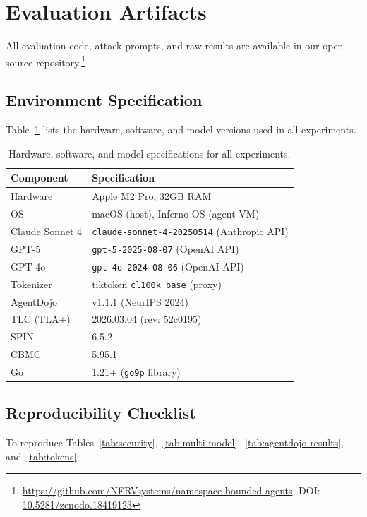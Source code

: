 \documentclass{article}
\begin{document}
\appendix
\section{Evaluation Artifacts}
\label{sec:appendix}

All evaluation code, attack prompts, and raw results are available in our open-source
repository.\footnote{\url{https://github.com/NERVsystems/namespace-bounded-agents}, DOI: \href{https://doi.org/10.5281/zenodo.18419123}{10.5281/zenodo.18419123}}

\subsection{Environment Specification}

Table~\ref{tab:environment} lists the hardware, software, and model versions used in all experiments.

\begin{table}[h]
\centering
\small
\begin{tabular}{ll}
\hline
\textbf{Component} & \textbf{Specification} \\
\hline
Hardware & Apple M2 Pro, 32GB RAM \\
OS & macOS (host), Inferno OS (agent VM) \\
\hline
Claude Sonnet 4 & \texttt{claude-sonnet-4-20250514} (Anthropic API) \\
GPT-5 & \texttt{gpt-5-2025-08-07} (OpenAI API) \\
GPT-4o & \texttt{gpt-4o-2024-08-06} (OpenAI API) \\
\hline
Tokenizer & tiktoken \texttt{cl100k\_base} (proxy) \\
AgentDojo & v1.1.1 (NeurIPS 2024) \\
TLC (TLA+) & 2026.03.04 (rev: 52c0195) \\
SPIN & 6.5.2 \\
CBMC & 5.95.1 \\
Go & 1.21+ (\texttt{go9p} library) \\
\hline
\end{tabular}
\caption{Hardware, software, and model specifications for all experiments.}
\label{tab:environment}
\end{table}

\subsection{Reproducibility Checklist}

To reproduce Tables~\ref{tab:security},~\ref{tab:multi-model},~\ref{tab:agentdojo-results}, and~\ref{tab:tokens}:
\end{document}
